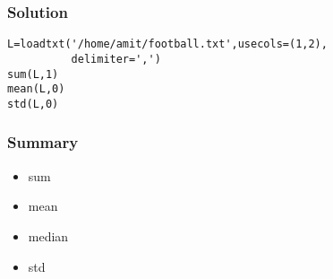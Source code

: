\documentclass[presentation]{beamer}
\begin{document}
\begin{frame}[fragile]
\frametitle{Solution}
\label{sec-4}

\begin{verbatim}
L=loadtxt('/home/amit/football.txt',usecols=(1,2),
          delimiter=',')
sum(L,1)
mean(L,0)
std(L,0)
\end{verbatim}
\end{frame}
\begin{frame}
\frametitle{Summary}
\label{sec-5}

\begin{itemize}
\item sum
\item mean
\item median
\item std
\end{itemize}
\end{frame}
\end{document}
